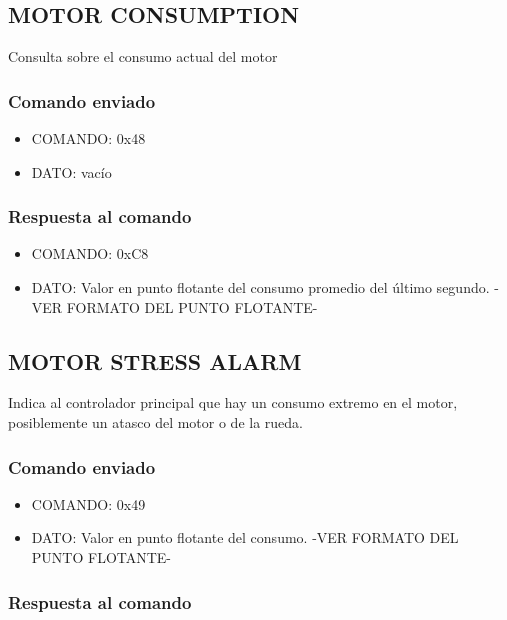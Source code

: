 \documentclass[a4paper,10pt]{article}
\begin{document}
\subsection{MOTOR CONSUMPTION}
\label{motor_consumption}

Consulta sobre el consumo actual del motor

\subsubsection*{Comando enviado}

\begin{itemize}
	\item{COMANDO:} 0x48
	\item{DATO:} vac\'io
\end{itemize}

\subsubsection*{Respuesta al comando}

\begin{itemize}
	\item{COMANDO:} 0xC8
	\item{DATO:} Valor en punto flotante del consumo promedio del \'ultimo segundo. -VER FORMATO DEL PUNTO FLOTANTE-
\end{itemize}

\subsection{MOTOR STRESS ALARM}
\label{motor_stress_alarm}

Indica al controlador principal que hay un consumo extremo en el motor, posiblemente un atasco del motor o de la rueda.

\subsubsection*{Comando enviado}

\begin{itemize}
	\item{COMANDO:} 0x49
	\item{DATO:} Valor en punto flotante del consumo. -VER FORMATO DEL PUNTO FLOTANTE-
\end{itemize}

\subsubsection*{Respuesta al comando}
\end{document}
